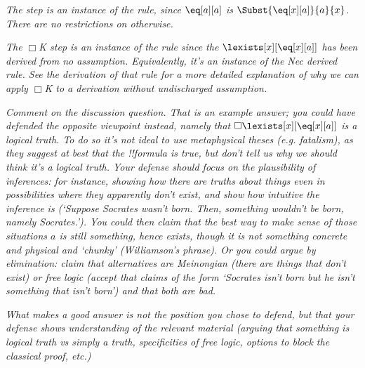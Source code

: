 \documentclass[../../../include/open-logic-section]{subfiles}
\begin{document}
\begin{prob}
\begin{ans}
        \emph{The \Intro{\lexists} step is an instance of 
        the rule, since $\eq[a][a]$ is $\Subst{\eq[x][a]}{a}{x}$. 
        There are no restrictions on \Intro{\lexists} otherwise.}
        
        \emph{The $\Box$K step is an instance of the rule since the
        $\lexists[x][\eq[x][a]]$ has been derived from no
        assumption. Equivalently, it's an instance of the Nec derived
        rule. See the derivation of that rule for a more detailed
        explanation of why we can apply $\Box$K to a derivation
        without undischarged assumption.}

        \emph{Comment on the discussion question. That is an example
        answer; you could have defended the opposite viewpoint
        instead, namely that $\Box\lexists[x][\eq[x][a]]$ is a logical 
        truth. To do so it's not ideal to use metaphysical theses
        (e.g. fatalism), as they suggest at best that the !!{formula}
        is true, but don't tell us why we should think it's a
        \emph{logical} truth. Your defense should focus on the
        plausibility of \Elim{\lexists} inferences: for instance,
        showing how there are truths about things even in
        possibilities where they apparently don't exist, and show how
        intuitive the \Elim{\lexists} inference is (`Suppose Socrates
        wasn't born. Then, something wouldn't be born, namely
        Socrates.'). You could then claim that the best way to make
        sense of those situations $a$ is still something, hence
        exists, though it is not something concrete and physical and
        `chunky' (Williamson's phrase). Or you could argue by
        elimination: claim that alternatives are Meinongian (there are
        things that don't exist) or free logic (accept that claims of
        the form `Socrates isn't born but he isn't something that
        isn't born') and that both are bad.}

        \emph{What makes a good answer is not the position you chose 
        to defend, but that your defense shows understanding of the 
        relevant material (arguing that something is logical truth 
        vs simply a truth, specificities of free logic, options to 
        block the classical proof, etc.)}

    \clearpage
    \end{ans}

\end{prob}
\end{document}

